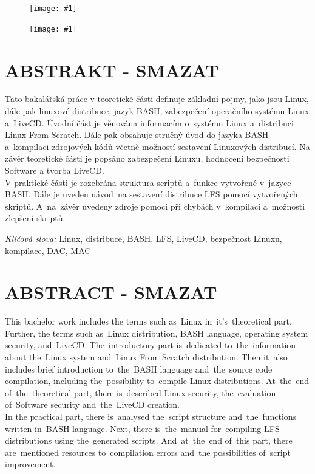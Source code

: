 \documentclass[a4paper,12pt,twoside,BCOR=10mm]{article}
\newcommand{\nm}[1]{\clearpage\section*{\uppercase{#1}}}  %
\newcommand{\nns}[1]{\section*{\uppercase{#1}}}   %
\newcommand{\obr}[3]{%
  \begin{figure}[h]
  \center\texttt{[image: \#1]}
  \caption{#3}
  \end{figure}
  }
\newcommand{\ofZadani}[2]{%
  \begin{figure}[h]
  \center\texttt{[image: \#1]}
  \end{figure}
  }
\begin{document}
\clearpage
\thispagestyle{empty}
\ofZadani{./img/ofZadani/ofZadaniStr1.png}{Oficiální zadání bakalářské práce strana 1}
\clearpage
\thispagestyle{empty}
\ofZadani{./img/ofZadani/ofZadaniStr2.png}{Oficiální zadání bakalářské práce strana 2}
\clearpage
\thispagestyle{empty}
\voffset=-1.61cm\evensidemargin=0.96cm\oddsidemargin=0.96cm\headsep=1cm\headheight=0.5cm\setlength{\parskip}{3pt}\textheight=248mm\textwidth=155mm
\nm{\uppercase{Abstrakt - smazat}}
\vspace{1cm}
Tato bakalářská práce v teoretické části definuje základní pojmy, jako jsou Linux, dále pak linuxové distribuce, jazyk BASH, zabezpečení operačního systému Linux a~LiveCD. Úvodní část je věnována informacím o~systému Linux a~distribuci Linux From Scratch. Dále pak obsahuje stručný úvod do jazyka BASH a~kompilaci zdrojových kódů včetně možností sestavení Linuxových distribucí. Na závěr teoretické části je popsáno zabezpečení Linuxu, hodnocení bezpečnosti Software a tvorba LiveCD.\\

V praktické části je rozebrána struktura scriptů a~funkce vytvořené v~jazyce BASH. Dále je uveden návod~na sestavení distribuce LFS pomocí vytvořených skriptů. A~na~závěr uvedeny zdroje pomoci při chybách v~kompilaci a~možnosti zlepšení skriptů.
\vspace{1cm}

\emph{Klíčová slova:} Linux, distribuce, BASH, LFS, LiveCD, bezpečnost Linuxu, kompilace, DAC, MAC
\vspace{2cm}

\nns{\uppercase{Abstract  - smazat}}
This bachelor work includes the terms such as~Linux in~it's~theoretical part. Further, the terms such as~Linux distribution, BASH language, operating system security, and~LiveCD. The~introductory part is~dedicated to~the~information about the~Linux system and~Linux From Scratch distribution. Then it~also includes brief introduction to~the~BASH language and~the~source code compilation, including the~possibility to~compile Linux distributions. At~the~end of~the~theoretical part, there is~described Linux security, the~evaluation of~Software security and~the~LiveCD creation.\\

In the practical part, there is~analysed the~script structure and~the~functions written in~BASH language. Next, there is~the~manual for~compiling LFS distributions using the~generated scripts. And~at~the~end of~this part, there are~mentioned resources to~compilation errors and~the possibilities of~script improvement.
\vspace{1cm}
\end{document}
